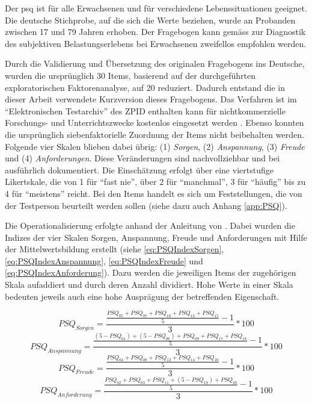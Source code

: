 Der \acrshort{psq} \cite{Fliege2001} ist für alle Erwachsenen und für verschiedene Lebenssituationen geeignet. Die deutsche Stichprobe, auf die sich die Werte beziehen, wurde an Probanden zwischen 17 und 79 Jahren erhoben. Der Fragebogen kann gemäss  zur Diagnostik des subjektiven Belastungserlebens bei Erwachsenen zweifellos empfohlen werden.

Durch die Validierung und Übersetzung des originalen Fragebogens ins Deutsche, wurden die ursprünglich 30 Items, basierend auf der durchgeführten exploratorischen Faktorenanalyse, auf 20 reduziert. Dadurch entstand die in dieser Arbeit verwendete Kurzversion dieses Fragebogens. Das Verfahren ist im \enquote{Elektronischen Testarchiv} des ZPID enthalten kann für nichtkommerzielle Forschungs- und Unterrichtszwecke kostenlos eingesetzt werden \cite{ZPID}. Ebenso konnten die ursprünglich siebenfaktorielle Zuordnung der Items nicht beibehalten werden. Folgende vier Skalen blieben dabei übrig: (1) \textit{Sorgen}, (2) \textit{Anspannung}, (3) \textit{Freude} und (4) \textit{Anforderungen}. Diese Veränderungen sind nachvollziehbar und bei  ausführlich dokumentiert. Die Einschätzung erfolgt über eine viertstufige Likertskale, die von 1 für \enquote{fast nie}, über 2 für \enquote{manchmal}, 3 für \enquote{häufig} bis zu 4 für \enquote{meistens} reicht. Bei den Items handelt es sich um Feststellungen, die von der Testperson beurteilt werden sollen (siehe dazu auch Anhang \ref{app:PSQ}). 

Die Operationalisierung erfolgte anhand der Anleitung von . Dabei wurden die Indizes der vier Skalen Sorgen, Anspannung, Freude und Anforderungen mit Hilfe der Mittelwertsbildung erstellt (siehe \ref{eq:PSQIndexSorgen}, \ref{eq:PSQIndexAnspannung}, \ref{eq:PSQIndexFreude} und \ref{eq:PSQIndexAnforderung}). Dazu werden die jeweiligen Items der zugehörigen Skala aufaddiert und durch deren Anzahl dividiert. Hohe Werte in einer Skala bedeuten jeweils auch eine hohe Ausprägung der betreffenden Eigenschaft.

\begin{equation}\label{eq:PSQIndexSorgen}
    PSQ_{Sorgen}=\frac{\frac{PSQ_{05}+PSQ_{07}+PSQ_{10}+PSQ_{13}+PSQ_{15}}{5}-1}{3}*100
\end{equation}
\begin{equation}\label{eq:PSQIndexAnspannung}
    PSQ_{Anspannung}=\frac{\frac{(5-PSQ_{01})+(5-PSQ_{06})+PSQ_{09}+PSQ_{17}+PSQ_{18}}{5}-1}{3}*100
\end{equation}
\begin{equation}\label{eq:PSQIndexFreude}
    PSQ_{Freude}=\frac{\frac{PSQ_{04}+PSQ_{08}+PSQ_{12}+PSQ_{14}+PSQ_{16}}{5}-1}{3}*100
\end{equation}
\begin{equation}\label{eq:PSQIndexAnforderung}
    PSQ_{Anforderung}=\frac{\frac{PSQ_{02}+PSQ_{03}+PSQ_{11}+(5-PSQ_{19})+PSQ_{20}}{5}-1}{3}*100
\end{equation}

